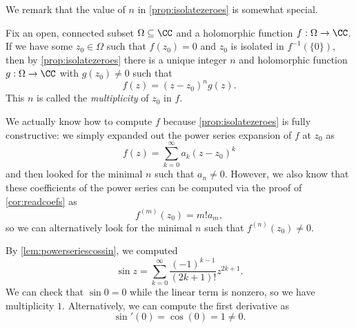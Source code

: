 We remark that the value of $n$ in \autoref{prop:isolatezeroes} is somewhat special.
\begin{definition}[Multiplicity]
	Fix an open, connected subset $\Omega\subseteq\CC$ and a holomorphic function $f:\Omega\to\CC$. If we have some $z_0\in\Omega$ such that $f(z_0)=0$ and $z_0$ is isolated in $f^{-1}(\{0\})$, then by \autoref{prop:isolatezeroes} there is a unique integer $n$ and holomorphic function $g:\Omega\to\CC$ with $g(z_0)\ne0$ such that
	\[f(z)=(z-z_0)^ng(z).\]
	This $n$ is called the \textit{multiplicity} of $z_0$ in $f$.
\end{definition}
We actually know how to compute $f$ because \autoref{prop:isolatezeroes} is fully constructive: we simply expanded out the power series expansion of $f$ at $z_0$ as
\[f(z)=\sum_{k=0}^\infty a_k(z-z_0)^k\]
and then looked for the minimal $n$ such that $a_n\ne0$. However, we also know that these coefficients of the power series can be computed via the proof of \autoref{cor:readcoefs} as
\[f^{(m)}(z_0)=m!a_m,\]
so we can alternatively look for the minimal $n$ such that $f^{(n)}(z_0)\ne0$.
\begin{example}
	By \autoref{lem:powerseriescossin}, we computed
	\[\sin z=\sum_{k=0}^\infty\frac{(-1)^{k-1}}{(2k+1)!}z^{2k+1}.\]
	We can check that $\sin0=0$ while the linear term is nonzero, so we have multiplicity $1$. Alternatively, we can compute the first derivative as
	\[\sin'(0)=\cos(0)=1\ne0.\]
\end{example}

